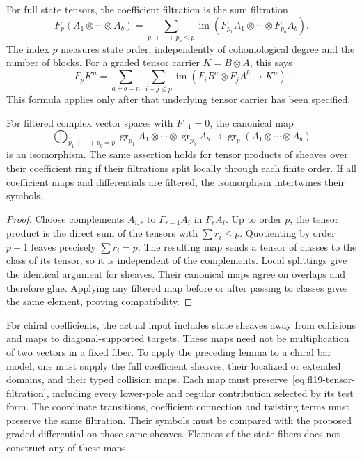 For full state tensors, the coefficient filtration is the sum filtration
\begin{equation}\label{eq:fl19-tensor-filtration}
F_p(A_1\otimes\cdots\otimes A_b)
=\sum_{p_1+\cdots+p_b\le p}
\operatorname{im}(F_{p_1}A_1\otimes\cdots\otimes F_{p_b}A_b).
\end{equation}
The index $p$ measures state order, independently of cohomological degree and the number of blocks.
For a graded tensor carrier $K=B\otimes A$, this says
\[
F_pK^n=\sum_{a+b=n}\ \sum_{i+j\le p}
\operatorname{im}(F_iB^a\otimes F_jA^b\to K^n).
\]
This formula applies only after that underlying tensor carrier has been specified.

\begin{lemma}\label{lem:fl19-tensor-symbol}
For filtered complex vector spaces with $F_{-1}=0$, the canonical map
\[
\bigoplus_{p_1+\cdots+p_b=p}
\operatorname{gr}_{p_1}A_1\otimes\cdots\otimes\operatorname{gr}_{p_b}A_b
\longrightarrow \operatorname{gr}_p(A_1\otimes\cdots\otimes A_b)
\]
is an isomorphism.
The same assertion holds for tensor products of sheaves over their coefficient ring if their filtrations split locally through each finite order.
If all coefficient maps and differentials are filtered, the isomorphism intertwines their symbols.
\end{lemma}
\begin{proof}
Choose complements $A_{i,r}$ to $F_{r-1}A_i$ in $F_rA_i$.
Up to order $p$, the tensor product is the direct sum of the tensors with $\sum r_i\le p$.
Quotienting by order $p-1$ leaves precisely $\sum r_i=p$.
The resulting map sends a tensor of classes to the class of its tensor, so it is independent of the complements.
Local splittings give the identical argument for sheaves.
Their canonical maps agree on overlaps and therefore glue.
Applying any filtered map before or after passing to classes gives the same element, proving compatibility.
\end{proof}

For chiral coefficients, the actual input includes state sheaves away from collisions and maps to diagonal-supported targets.
These maps need not be multiplication of two vectors in a fixed fiber.
To apply the preceding lemma to a chiral bar model, one must supply the full coefficient sheaves, their localized or extended domains, and their typed collision maps.
Each map must preserve~\eqref{eq:fl19-tensor-filtration}, including every lower-pole and regular contribution selected by its test form.
The coordinate transitions, coefficient connection and twisting terms must preserve the same filtration.
Their symbols must be compared with the proposed graded differential on those same sheaves.
Flatness of the state fibers does not construct any of these maps.

